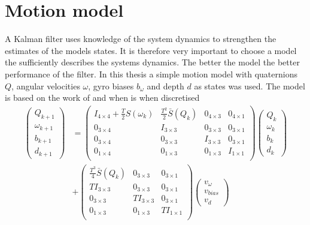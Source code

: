 \section{Motion model}
A Kalman filter uses knowledge of the system dynamics to strengthen the estimates of the models states. It is therefore very important to choose a model the sufficiently describes the systems dynamics. The better the model the better performance of the filter. In this thesis a simple motion model with quaternions $Q$, angular velocities $\omega$, gyro biases $b_{\omega}$ and depth $d$ as states was used. The model is based on the work of  and when is when discretised 
\begin{equation}
\begin{split}
\begin{pmatrix}
Q_{k+1}\\
\omega_{k+1}\\
b_{k+1}\\
d_{k+1}
\end{pmatrix}&=
\left(
\begin{array}{c|c|c|c}
I_{4\times4} + \frac{T}{2}S(\omega_{k})& \frac{T^2}{2} \bar{S}(Q_{k}) & 0_{4\times3} & 0_{4\times1} \\
\hline
0_{3\times4} & I_{3\times3} & 0_{3\times3} & 0_{3\times1}\\
\hline
0_{3\times4} & 0_{3\times3} & I_{3\times3} & 0_{3\times1}\\
\hline
0_{1\times4} & 0_{1\times3} & 0_{1\times3} & I_{1\times1}\\
\end{array}
\right)
\begin{pmatrix}
Q_{k}\\
\omega_{k}\\
b_{k}\\
d_{k}
\end{pmatrix}
\\ &+\left(\begin{array}{c|c|c}
\frac{T^3}{4}\bar{S}(Q_{k}) & 0_{3\times3} & 0_{3\times1}\\
\hline
T I_{3\times3}& 0_{3\times3} & 0_{3\times1}\\
\hline
0_{3\times3} & T I_{3\times3} & 0_{3\times1}\\
\hline
0_{1\times3} & 0_{1\times3} & T I_{1\times1}\\
\end{array}
\right)
\begin{pmatrix}
v_{\omega}\\
v_{bias}\\
v_{d}
\end{pmatrix}
\end{split}
\end{equation}
